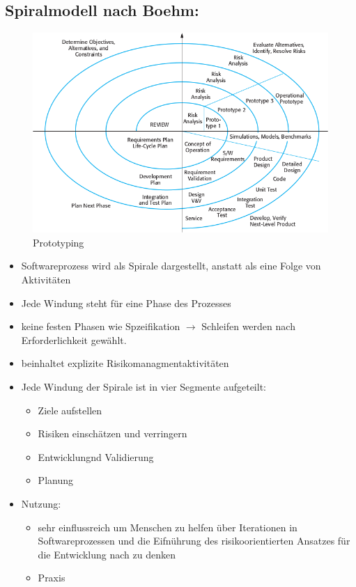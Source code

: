 \subsection{Spiralmodell nach Boehm:}
\begin{figure}
    \centering
    \includegraphics[width=12.5cm]{mainmatter/pics/boehm.png}
    \caption{Prototyping}
\end{figure}
\begin{itemize}
    \item Softwareprozess wird als Spirale dargestellt, anstatt als eine Folge von Aktivitäten 
    \item Jede Windung steht für eine Phase des Prozesses
    \item keine festen Phasen wie Spzeifikation $\rightarrow$ Schleifen werden nach Erforderlichkeit gewählt.
    \item beinhaltet explizite Risikomanagmentaktivitäten
    \item Jede Windung der Spirale ist in vier Segmente aufgeteilt:
    \begin{itemize}
        \item Ziele aufstellen
        \item Risiken einschätzen und verringern
        \item Entwicklungnd Validierung
        \item Planung
    \end{itemize}
    \item Nutzung:
    \begin{itemize}
        \item sehr einflussreich um Menschen zu helfen über Iterationen in Softwareprozessen und die Eifnührung des risikoorientierten Ansatzes für die Entwicklung nach zu denken
        \item Praxis
    \end{itemize} 
\end{itemize}

